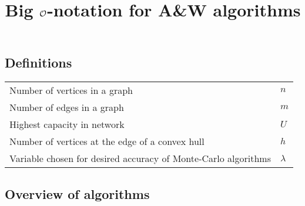 \documentclass[a4paper,10pt]{article}
\title{\vspace*{-2cm}Big \(\mathcal{O}\)-notation for A\&W algorithms}
\date{}
\begin{document}
    \maketitle
    \renewcommand{\arraystretch}{1.25}
    \subsection*{Definitions}
    \begin{center}
        \begin{tabularx}{\textwidth}{l >{\raggedleft\arraybackslash}X}
            \toprule
            Number of vertices in a graph & \(n\) \\
            Number of edges in a graph & \(m\) \\
            Highest capacity in network & \(U\) \\
            Number of vertices at the edge of a convex hull & \(h\) \\
            Variable chosen for desired accuracy of Monte-Carlo algorithms & \(\lambda\) \\
            \bottomrule
        \end{tabularx}
    \end{center}

    \subsection*{Overview of algorithms}
\end{document}
